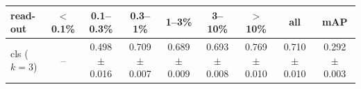 \begin{tabular}{lcccccccc}
\toprule
read-out & $<$0.1\% & 0.1--0.3\% & 0.3--1\% & 1--3\% & 3--10\% & $>$10\% & all & mAP \\
\midrule
cls ($k=3$) & -- & 0.498 $\pm$ 0.016 & 0.709 $\pm$ 0.007 & 0.689 $\pm$ 0.009 & 0.693 $\pm$ 0.008 & 0.769 $\pm$ 0.010 & 0.710 $\pm$ 0.010 & 0.292 $\pm$ 0.003 \\
\bottomrule
\end{tabular}
